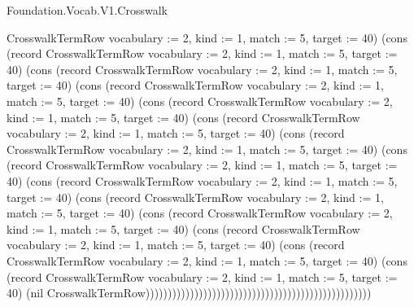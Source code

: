 \begin{lexlean}{Foundation.Vocab.V1.Crosswalk}
\begin{semanticmodule}
{CrosswalkTermRow {vocabulary := 2, kind := 1, match := 5, target := 40}) (cons (record CrosswalkTermRow {vocabulary := 2, kind := 1, match := 5, target := 40}) (cons (record CrosswalkTermRow {vocabulary := 2, kind := 1, match := 5, target := 40}) (cons (record CrosswalkTermRow {vocabulary := 2, kind := 1, match := 5, target := 40}) (cons (record CrosswalkTermRow {vocabulary := 2, kind := 1, match := 5, target := 40}) (cons (record CrosswalkTermRow {vocabulary := 2, kind := 1, match := 5, target := 40}) (cons (record CrosswalkTermRow {vocabulary := 2, kind := 1, match := 5, target := 40}) (cons (record CrosswalkTermRow {vocabulary := 2, kind := 1, match := 5, target := 40}) (cons (record CrosswalkTermRow {vocabulary := 2, kind := 1, match := 5, target := 40}) (cons (record CrosswalkTermRow {vocabulary := 2, kind := 1, match := 5, target := 40}) (cons (record CrosswalkTermRow {vocabulary := 2, kind := 1, match := 5, target := 40}) (cons (record CrosswalkTermRow {vocabulary := 2, kind := 1, match := 5, target := 40}) (cons (record CrosswalkTermRow {vocabulary := 2, kind := 1, match := 5, target := 40}) (cons (record CrosswalkTermRow {vocabulary := 2, kind := 1, match := 5, target := 40}) (nil CrosswalkTermRow)))))))))))))))))))))))))))))))))))))))))))))))))))
}


\end{semanticmodule}
\end{lexlean}
